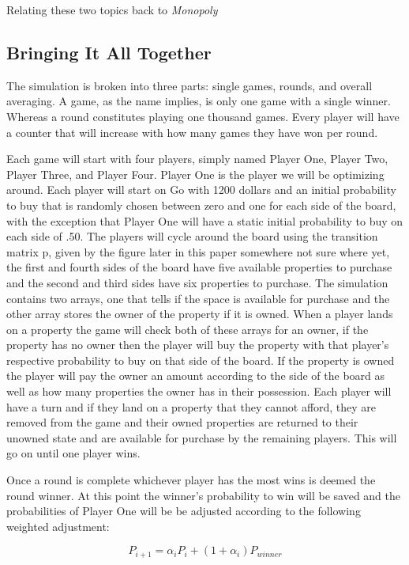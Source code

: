 \documentclass{article}
\begin{document}
Relating these two topics back to \textit{Monopoly}

\subsection{Bringing It All Together}

The simulation is broken into three parts: single games, rounds, and overall averaging.  A game, as the name implies, is only one game with a single winner.  Whereas a round constitutes playing one thousand games.  Every player will have a counter that will increase with how many games they have won per round.

Each game will start with four players, simply named Player One, Player Two, Player Three, and Player Four.  Player One is the player we will be optimizing around.  Each player will start on Go with 1200 dollars and an initial probability to buy that is randomly chosen between zero and one for each side of the board, with the exception that Player One will have a static initial probability to buy on each side of .50.  The players will cycle around the board using the transition matrix p, given by the figure later in this paper somewhere not sure where yet, the first and fourth sides of the board have five available properties to purchase and the second and third sides have six properties to purchase.  The simulation contains two arrays, one that tells if the space is available for purchase and the other array stores the owner of the property if it is owned.  When a player lands on a property the game will check both of these arrays for an owner, if the property has no owner then the player will buy the property with that player’s respective probability to buy on that side of the board.  If the property is owned the player will pay the owner an amount according to the side of the board as well as how many properties the owner has in their possession.  Each player will have a turn and if they land on a property that they cannot afford, they are removed from the game and their owned properties are returned to their unowned state and are available for purchase by the remaining players.  This will go on until one player wins.  

Once a round is complete whichever player has the most wins is deemed the round winner.  At this point the winner’s probability to win will be saved and the probabilities of Player One will be be adjusted according to the following weighted adjustment:

\begin{equation}
    \label{probability_adjustment}
    P_{i+1} = \alpha_i P_i + (1+\alpha_i)P_{winner}
\end{equation}
\end{document}
